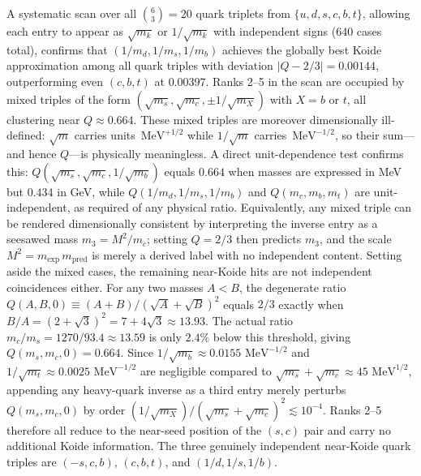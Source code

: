 \documentclass[12pt,a4paper]{article}
\newcommand{\MeV}{\,\text{MeV}}
\begin{document}
A systematic scan over all $\binom{6}{3} = 20$ quark triplets from
$\{u,d,s,c,b,t\}$, allowing each entry to appear as $\sqrt{m_k}$
or $1/\sqrt{m_k}$ with independent signs (640 cases total), confirms
that $(1/m_d,1/m_s,1/m_b)$ achieves the globally best Koide
approximation among all quark triples with deviation $|Q-2/3| =
0.00144$, outperforming even $(c,b,t)$ at $0.00397$.  Ranks 2--5 in
the scan are occupied by mixed triples of the form $(\sqrt{m_s},
\sqrt{m_c}, \pm 1/\sqrt{m_X})$ with $X = b$ or $t$, all clustering
near $Q \approx 0.664$.  These mixed triples are moreover
dimensionally ill-defined: $\sqrt{m}$ carries units
$\MeV^{+1/2}$ while $1/\sqrt{m}$ carries $\MeV^{-1/2}$, so
their sum---and hence $Q$---is physically meaningless.
A direct unit-dependence test confirms this: $Q(\sqrt{m_s},\sqrt{m_c},1/\sqrt{m_b})$
equals $0.664$ when masses are expressed in MeV but $0.434$ in GeV,
while $Q(1/m_d,1/m_s,1/m_b)$ and $Q(m_c,m_b,m_t)$ are
unit-independent, as required of any physical ratio.
Equivalently, any mixed triple can be rendered dimensionally consistent
by interpreting the inverse entry as a seesawed mass
$m_3 = M^2/m_c$; setting $Q = 2/3$ then predicts $m_3$,
and the scale $M^2 = m_\mathrm{exp}\,m_\mathrm{pred}$ is merely
a derived label with no independent content.
Setting aside the mixed cases, the remaining near-Koide hits are not independent
coincidences either.  For any two masses $A < B$, the degenerate ratio
$Q(A,B,0) \equiv (A+B)/(\sqrt{A}+\sqrt{B})^2$ equals $2/3$ exactly
when $B/A = (2+\sqrt{3})^2 = 7+4\sqrt{3} \approx 13.93$.
The actual ratio $m_c/m_s = 1270/93.4 \approx 13.59$ is only $2.4\%$
below this threshold, giving $Q(m_s,m_c,0) = 0.664$.
Since $1/\sqrt{m_b} \approx 0.0155\,\MeV^{-1/2}$ and
$1/\sqrt{m_t} \approx 0.0025\,\MeV^{-1/2}$ are negligible compared
to $\sqrt{m_s}+\sqrt{m_c} \approx 45\,\MeV^{1/2}$, appending any
heavy-quark inverse as a third entry merely perturbs $Q(m_s,m_c,0)$
by order $(1/\sqrt{m_X})/(\sqrt{m_s}+\sqrt{m_c})^2 \lesssim 10^{-4}$.
Ranks 2--5 therefore all reduce to the near-seed position of the
$(s,c)$ pair and carry no additional Koide information.  The three
genuinely independent near-Koide quark triples are
$(-s,c,b)$, $(c,b,t)$, and $(1/d,1/s,1/b)$.
\end{document}
